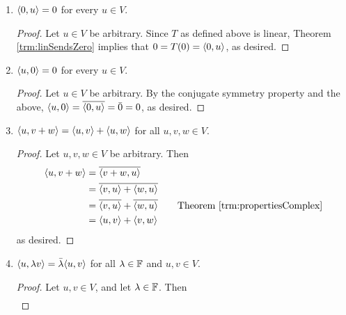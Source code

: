 \documentclass[../main.tex]{subfiles}
\begin{document}
\begin{itemize}
\begin{theorem}
\begin{enumerate}[label={\textup{(}\alph*\textup{)}},ref={\thetheorem\arabic*}]
\begin{proof}
                \begin{align*}
                    T(v+w) &= \inp{v+w}{u}&
                        T(\lambda v) &= \inp{\lambda v}{u}\\
                    &= \inp{v}{u}+\inp{w}{u}&
                        &= \lambda\inp{v}{u}\\
                    &= Tv+Tw&
                        &= \lambda Tv
                \end{align*}
                as desired.
            \end{proof}
            \item \label{trm:inpPropertiesb}$\langle{0},{u}\rangle=0$ for every $u\in V$.
            \begin{proof}
                Let $u\in V$ be arbitrary. Since $T$ as defined above is linear, Theorem \ref{trm:linSendsZero} implies that $0=T(0)=\langle{0},{u}\rangle$, as desired.
            \end{proof}
            \item \label{trm:inpPropertiesc}$\langle{u},{0}\rangle=0$ for every $u\in V$.
            \begin{proof}
                Let $u\in V$ be arbitrary. By the conjugate symmetry property and the above, $\langle{u},{0}\rangle=\overline{\langle{0},{u}\rangle}=\bar{0}=0$, as desired.
            \end{proof}
            \item \label{trm:inpPropertiesd}$\langle{u},{v+w}\rangle=\langle{u},{v}\rangle+\langle{u},{w}\rangle$ for all $u,v,w\in V$.
            \begin{proof}
                Let $u,v,w\in V$ be arbitrary. Then
                \begin{align*}
                    \inp{u}{v+w} &= \overline{\inp{v+w}{u}}\\
                    &= \overline{\inp{v}{u}+\inp{w}{u}}\\
                    &= \overline{\inp{v}{u}}+\overline{\inp{w}{u}}\tag*{Theorem \ref{trm:propertiesComplex}}\\
                    &= \inp{u}{v}+\inp{v}{w}
                \end{align*}
                as desired.
            \end{proof}
            \item \label{trm:inpPropertiese}$\langle{u},{\lambda v}\rangle=\bar{\lambda}\langle{u},{v}\rangle$ for all $\lambda\in\mathbb{F}$ and $u,v\in V$.
            \begin{proof}
                Let $u,v\in V$, and let $\lambda\in\mathbb{F}$. Then
                \begin{align*}

\end{align*}
\end{proof}
\end{enumerate}
\end{theorem}
\end{itemize}
\end{document}
